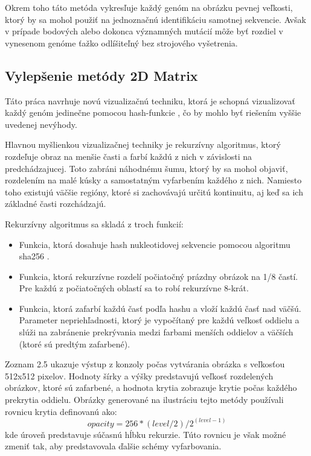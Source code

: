 Okrem toho táto metóda vykresľuje každý genóm na obrázku pevnej veľkosti, ktorý by sa mohol použiť na jednoznačnú identifikáciu samotnej sekvencie.
Avšak v prípade bodových alebo dokonca významných mutácií môže byť rozdiel v vynesenom genóme ťažko odlíšiteľný bez strojového vyšetrenia.

\subsection{Vylepšenie metódy 2D Matrix}
Táto práca navrhuje novú vizualizačnú techniku, ktorá je schopná vizualizovať každý genóm jedinečne pomocou hash-funkcie \cite{hash}, čo by mohlo byť riešením vyššie uvedenej nevýhody.

Hlavnou myšlienkou vizualizačnej techniky je rekurzívny algoritmus, ktorý rozdeľuje obraz na menšie časti a farbí každú z nich v závislosti na predchádzajucej.
Toto zabráni náhodnému šumu, ktorý by sa mohol objaviť, rozdelením na malé kúsky a samostatným vyfarbením každého z nich.
Namiesto toho existujú väčšie regióny, ktoré si zachovávajú určitú kontinuitu, aj keď sa ich základné časti rozchádzajú.

Rekurzívny algoritmus sa skladá z troch funkcií:
\begin{itemize}
    \item Funkcia, ktorá dosahuje hash nukleotidovej sekvencie pomocou algoritmu sha256 \cite{hash2}.
    \item Funkcia, ktorá rekurzívne rozdelí počiatočný prázdny obrázok na 1/8 častí.
    Pre každú z počiatočných oblastí sa to robí rekurzívne 8-krát.
    \item Funkcia, ktorá zafarbí každú časť podľa hashu a vloží každú časť nad väčšú.
    Parameter nepriehľadnosti, ktorý je vypočítaný pre každú veľkosť oddielu a slúži na zabránenie prekrývania medzi farbami menších oddielov a väčších (ktoré sú predtým zafarbené).
\end{itemize}

Zoznam 2.5 ukazuje výstup z konzoly počas vytvárania obrázka s veľkosťou 512x512 pixelov.
Hodnoty šírky a výšky predstavujú veľkosť rozdelených obrázkov, ktoré sú zafarbené, a hodnota krytia zobrazuje krytie počas každého prekrytia oddielu.
Obrázky generované na ilustráciu tejto metódy používali rovnicu krytia definovanú ako:\\
\[opacity = 256 * (level / 2) / 2 ^ {(level - 1)}\]
kde úroveň predstavuje súčasnú hĺbku rekurzie. 
Túto rovnicu je však možné zmeniť tak, aby predstavovala ďalšie schémy vyfarbovania.

